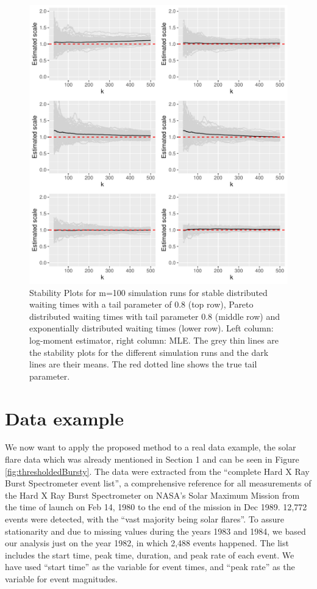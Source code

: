 \documentclass[]{elsarticle} %
\begin{document}
\begin{figure}

{\centering \includegraphics[width=0.9\linewidth]{article_springer_files/figure-latex/ScaleSimuplots-1} 

}

\caption{\label{Fig:ScaleSimu} Stability Plots for m=100 simulation runs for stable distributed waiting times with a tail parameter of 0.8 (top row), Pareto distributed waiting times with tail parameter 0.8 (middle row) and exponentially distributed waiting times (lower row). Left column: log-moment estimator, right column: MLE. The grey thin lines are the stability plots for the different simulation runs and the dark lines are their means. The red dotted line shows the true tail parameter.}\label{fig:ScaleSimuplots}
\end{figure}

\hypertarget{data-example}{%
\section{Data example}\label{data-example}}

We now want to apply the proposed method to a real data example, the
solar flare data which was already mentioned in Section 1 and can be
seen in Figure \ref{fig:thresholdedBursty}. The data were extracted from
the ``complete Hard X Ray Burst Spectrometer event list'', a
comprehensive reference for all measurements of the Hard X Ray Burst
Spectrometer on NASA's Solar Maximum Mission from the time of launch on
Feb 14, 1980 to the end of the mission in Dec 1989. 12,772 events were
detected, with the ``vast majority being solar flares''. To assure
stationarity and due to missing values during the years 1983 and 1984,
we based our analysis just on the year 1982, in which 2,488 events
happened. The list includes the start time, peak time, duration, and
peak rate of each event. We have used ``start time'' as the variable for
event times, and ``peak rate'' as the variable for event magnitudes.
\end{document}
